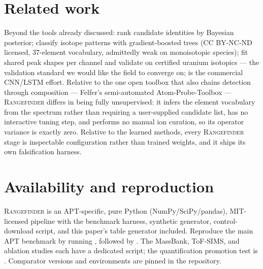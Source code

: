 \documentclass[11pt]{article}
\newcommand{\rf}{\textsc{Rangefinder}}
\begin{document}
\section{Related work}
Beyond the tools already discussed:
\citet{mikhalychev2020} rank candidate identities by Bayesian posterior;
\citet{wei2021patterns} classify isotope patterns with gradient-boosted
trees (CC BY-NC-ND licensed, 37-element vocabulary, admittedly weak on
monoisotopic species); \citet{meisenkothen2021} fit shared peak shapes
per channel and validate on certified uranium isotopics ---
the validation standard we would like the field to converge on;
\citet{wei2025automated} is the commercial CNN/LSTM effort. Relative to the
one open toolbox that also chains detection through composition ---
Felfer's semi-automated Atom-Probe-Toolbox
\citep{heller2024matlab,felfer_toolbox} --- \rf{} differs in being fully
unsupervised: it infers the element vocabulary from the spectrum rather
than requiring a user-supplied candidate list, has no interactive tuning
step, and performs no manual ion curation, so its operator variance is
exactly zero. Relative to the learned methods, every \rf{} stage is
inspectable configuration rather than trained weights, and it ships its own
falsification harness.

\section{Availability and reproduction}
\rf{} is an APT-specific, pure Python (NumPy/SciPy/pandas), MIT-licensed
pipeline with the
benchmark harness, synthetic generator, control-download script, and
this paper's table generator included. Reproduce the main APT benchmark by
running , followed by
. The MassBank, ToF-SIMS, and ablation studies
each have a dedicated script; the quantification promotion test is
. Comparator versions and environments are
pinned in the repository.
\end{document}
